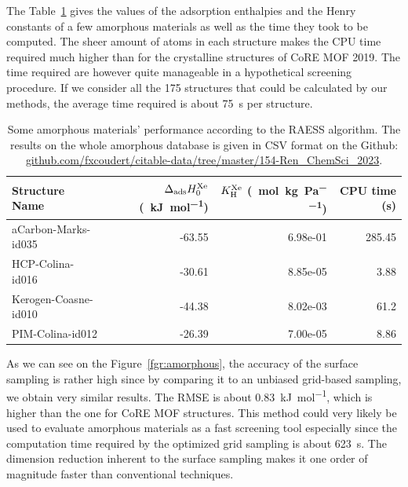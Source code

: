 \documentclass[main]{subfiles}
\begin{document}
The Table~\ref{tab:amorphous} gives the values of the adsorption enthalpies and the Henry constants of a few amorphous materials as well as the time they took to be computed. The sheer amount of atoms in each structure makes the CPU time required much higher than for the crystalline structures of CoRE MOF 2019. The time required are however quite manageable in a hypothetical screening procedure. If we consider all the 175 structures that could be calculated by our methods, the average time required is about \SI{75}{\second} per structure. 

\begin{table}[hb]
  \begin{tabular}{|l|r|r|r|}
    \hline
    Structure Name & $\Delta_{\text{ads}}H_{\text{0}}^{\text{Xe}}$ (\SI{}{\kilo\joule\per\mole}) & $K_{\text{H}}^{\text{Xe}}$ (\SI{}{\mole\per\kilo\gram\per\pascal}) & CPU time (s) \\
    \hline
    aCarbon-Marks-id035 &                 -63.55 &            6.98e-01 & 285.45 \\
    HCP-Colina-id016 &                 -30.61 &            8.85e-05 & 3.88 \\
    Kerogen-Coasne-id010 &                 -44.38 &            8.02e-03 & 61.2 \\
    PIM-Colina-id012 &                 -26.39 &            7.00e-05 & 8.86 \\
    \hline
    \end{tabular}
    \caption{Some amorphous materials' performance according to the RAESS algorithm. The results on the whole amorphous database is given in CSV format on the Github: \url{github.com/fxcoudert/citable-data/tree/master/154-Ren_ChemSci_2023}.}\label{tab:amorphous}
\end{table}

As we can see on the Figure~\ref{fgr:amorphous}, the accuracy of the surface sampling is rather high since by comparing it to an unbiased grid-based sampling, we obtain very similar results. The RMSE is about \SI{0.83}{\kJ\per\mol}, which is higher than the one for CoRE MOF structures. This method could very likely be used to evaluate amorphous materials as a fast screening tool especially since the computation time required by the optimized grid sampling is about \SI{623}{\second}. The dimension reduction inherent to the surface sampling makes it one order of magnitude faster than conventional techniques.
\end{document}

